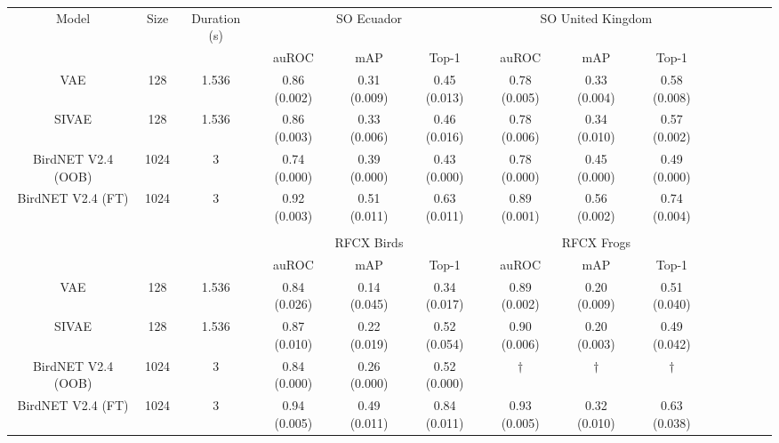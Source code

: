 \begin{tabular}{*{14}c}
\toprule
Model & Size & Duration (s) & \multicolumn{3}{c}{SO Ecuador} & \multicolumn{3}{c}{SO United Kingdom} \\
\cmidrule(lr){4-6} \cmidrule(lr){7-9} 
{}    & {}      & {} & auROC &  mAP & Top-1          &  auROC &  mAP &  Top-1   \\
\midrule
VAE & 128 & 1.536 & 0.86 (0.002) & 0.31 (0.009) & 0.45 (0.013) & 0.78 (0.005) & 0.33 (0.004) & 0.58 (0.008) \\
SIVAE & 128 & 1.536  & 0.86 (0.003) & 0.33 (0.006) & 0.46 (0.016) & 0.78 (0.006) & 0.34 (0.010) & 0.57 (0.002) \\
BirdNET V2.4 (OOB) & 1024 & 3 & 0.74 (0.000) & 0.39 (0.000) & 0.43 (0.000) & 0.78 (0.000) & 0.45 (0.000) & 0.49 (0.000) \\
BirdNET V2.4 (FT) & 1024 & 3 & 0.92 (0.003) & 0.51 (0.011) & 0.63 (0.011) & 0.89 (0.001) & 0.56 (0.002) & 0.74 (0.004) \\
\hline \\
{} & {}  & & \multicolumn{3}{c}{RFCX Birds} & \multicolumn{3}{c}{RFCX Frogs} \\
\cmidrule(lr){4-6} \cmidrule(lr){7-9} 
{}    & {} &  {}   &  auROC &  mAP & Top-1          &  auROC &  mAP &  Top-1                   \\
\midrule
VAE & 128 & 1.536 & 0.84 (0.026) & 0.14 (0.045) & 0.34 (0.017) & 0.89 (0.002) & 0.20 (0.009) & 0.51 (0.040) \\
SIVAE & 128 & 1.536 & 0.87 (0.010) & 0.22 (0.019) & 0.52 (0.054) & 0.90 (0.006) & 0.20 (0.003) & 0.49 (0.042) \\
BirdNET V2.4 (OOB) & 1024 & 3 & 0.84 (0.000) & 0.26 (0.000) & 0.52 (0.000) & $\dagger$ & $\dagger$ & $\dagger$ \\
BirdNET V2.4 (FT) & 1024 & 3 & 0.94 (0.005) & 0.49 (0.011) & 0.84 (0.011) & 0.93 (0.005) & 0.32 (0.010) & 0.63 (0.038) \\

\end{tabular}
